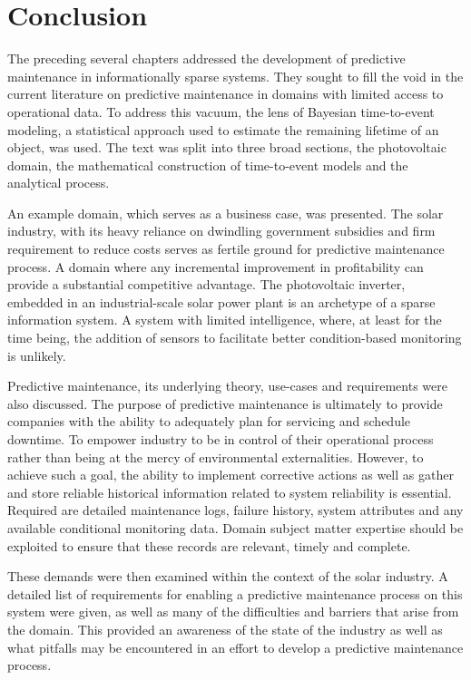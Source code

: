 \chapter*{Conclusion}



The preceding several chapters addressed the development of predictive maintenance in informationally sparse systems. They sought to fill the void in the current literature on predictive maintenance in domains with limited access to operational data. To address this vacuum, the lens of Bayesian time-to-event modeling, a statistical approach used to estimate the remaining lifetime of an object, was used. The text was split into three broad sections, the photovoltaic domain, the mathematical construction of time-to-event models and the analytical process. 

An example domain, which serves as a business case, was presented. The solar industry, with its heavy reliance on dwindling government subsidies and firm requirement to reduce costs serves as fertile ground for predictive maintenance process. A domain where any incremental improvement in profitability can provide a substantial competitive advantage. The photovoltaic inverter, embedded in an industrial-scale solar power plant is an archetype of a sparse information system. A system with limited intelligence, where, at least for the time being, the addition of sensors to facilitate better condition-based monitoring is unlikely. 

Predictive maintenance, its underlying theory, use-cases and requirements were also discussed. The purpose of predictive maintenance is ultimately to provide companies with the ability to adequately plan for servicing and schedule downtime. To empower industry to be in control of their operational process rather than being at the mercy of environmental externalities. However, to achieve such a goal, the ability to implement corrective actions as well as gather and store reliable historical information related to system reliability is essential. Required are detailed maintenance logs, failure history, system attributes and any available conditional monitoring data. Domain subject matter expertise should be exploited to ensure that these records are relevant, timely and complete. 

These demands were then examined within the context of the solar industry. A detailed list of requirements for enabling a predictive maintenance process on this system were given, as well as many of the difficulties and barriers that arise from the domain. This provided an awareness of the state of the industry as well as what pitfalls may be encountered in an effort to develop a predictive maintenance process.

